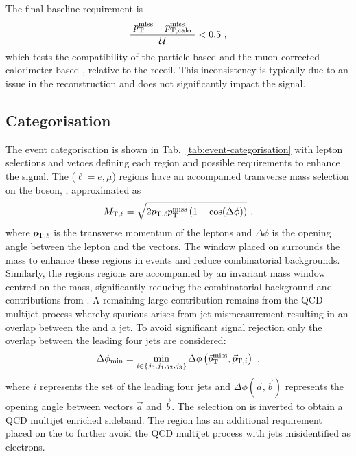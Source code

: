The final baseline requirement is
%
\begin{equation}
    \frac{\big| p_{\text{T}}^{\mathrm{miss}} - p_{\text{T,calo}}^{\mathrm{miss}} \big|}{\mathcal{U}} < 0.5\ ,
\end{equation}
%
which tests the compatibility of the particle-based \ptmiss and the
muon-corrected calorimeter-based \ptmisscalo, relative to the recoil. This
inconsistency is typically due to an issue in the reconstruction and does not
significantly impact the signal.


\subsection{Categorisation}\label{sec:categorisation}

The event categorisation is shown in Tab.~\ref{tab:event-categorisation} with
lepton selections and vetoes defining each region and possible requirements to
enhance the signal. The \ellplusjets ($\ell=e,\mu$) regions have an
accompanied transverse mass selection on the \PW boson, \mtell, approximated as
%
\begin{equation}
    \mtell = \sqrt{2 \mom_{\mathrm{T},\ell} \ptmiss \left( 1 - \cos(\Delta\phi)\right)}\ ,
\end{equation}
%
where $p_{\mathrm{T},\ell}$ is the transverse momentum of the leptons and
$\Delta\phi$ is the opening angle between the lepton and the \vecptmiss
vectors. The window placed on \mtell surrounds the \PW mass to enhance these
regions in \IWj events and reduce combinatorial backgrounds. Similarly, the
\diellplusjets regions regions are accompanied by an invariant mass \mellell
window centred on the \PZ mass, significantly reducing the combinatorial
background and contributions from \Igstarj. A remaining large contribution
remains from the QCD multijet process whereby spurious \ptmiss arises from jet
mismeasurement resulting in an overlap between the \ptmiss and a jet. To
avoid significant signal rejection only the overlap between the leading four
jets are considered:
%
\begin{equation}
    \Delta\phi_{\mathrm{min}} = \min_{i\in\{j_0,j_1,j_2,j_3\}} \Delta\phi\left(\vec{p}_{\text{T}}^{\mathrm{miss}}, \vec{p}_{\mathrm{T},i}\right)\ ,
\end{equation}
%
where $i$ represents the set of the leading four jets and
$\Delta\phi(\vec{a},\vec{b})$ represents the opening angle between vectors
$\vec{a}$ and $\vec{b}$. The selection on \mindphi is inverted to obtain a QCD
multijet enriched sideband. The \eleplusjets region has an additional
requirement placed on the \ptmiss to further avoid the QCD multijet process
with jets misidentified as electrons.

